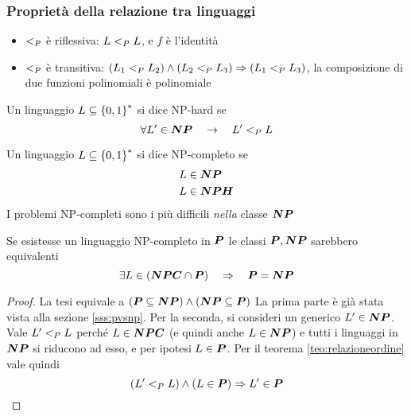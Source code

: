 \subsubsection{Proprietà della relazione tra linguaggi}
\begin{itemize}
    \item $<_P$ è riflessiva: $L <_P L$, e $f$ è l'identità
    \item $<_P$ è transitiva: $(L_1 <_P L_2) \wedge (L_2 <_P L_3) \Rightarrow (L_1 <_P L_3)$, la composizione di due funzioni polinomiali è polinomiale
\end{itemize}

\begin{definition}[NP-hard]
    \label{def:nphard}
    Un linguaggio $L \subseteq \left\{0,1\right\}^{*}$ si dice NP-hard se
    \begin{equation*}
        \forall L' \in \bm{NP} \quad \to \quad L' <_P L
    \end{equation*}
\end{definition}

\begin{definition}[NP-completo]
    \label{def:npcompleto}
    Un linguaggio $L \subseteq \left\{0,1\right\}^{*}$ si dice NP-completo se
    \begin{align*}
        L & \in \bm{NP} \\
        L & \in \bm{NPH}
    \end{align*}
    I problemi NP-completi sono i più difficili \emph{nella} classe $\bm{NP}$
\end{definition}

\begin{corollario}[P=NP]
    Se esistesse un linguaggio NP-completo in $\bm{P}$ le classi $\bm{P}, \bm{NP}$ sarebbero equivalenti
    \begin{equation*}
        \exists L \in \left( \bm{NPC} \cap \bm{P} \right)
        \quad
        \Rightarrow
        \quad
        \bm{P} = \bm{NP}
    \end{equation*}
\end{corollario}
\begin{proof}
    La tesi equivale a $ ( \bm{P} \subseteq \bm{NP} ) \wedge ( \bm{NP} \subseteq \bm{P} )$
    La prima parte è già stata vista alla sezione \ref{sss:pvsnp}. Per la seconda, si consideri un generico $L' \in \bm{NP}$. Vale $L' <_P L$ perché $L \in \bm{NPC}$ (e quindi anche $L \in \bm{NP}$) e tutti i linguaggi in $\bm{NP}$ si riducono ad esso, e per ipotesi $L \in \bm{P}$. Per il teorema \ref{teo:relazioneordine} vale quindi
    \begin{equation*}
        \left( L' <_P L \right) \wedge \left( L \in \bm{P} \right) \Rightarrow   L' \in \bm{P} 
    \end{equation*}
\end{proof}

